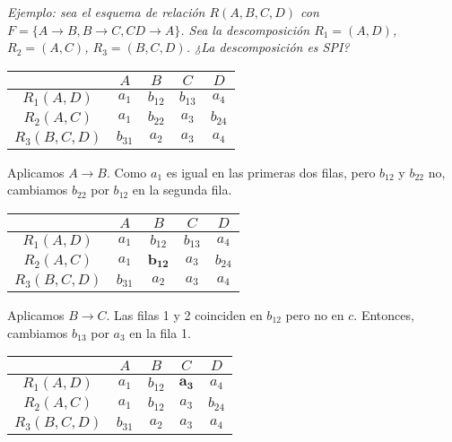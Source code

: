 \documentclass[a4paper, twoside]{article}
\begin{document}
\emph{Ejemplo: sea el esquema de relación $R(A,B,C,D)$ con $F=\{A\to B,B\to C,CD\to A\}$.
Sea la descomposición $R_{1}=(A,D)$, $R_{2}=(A,C)$, $R_{3}=(B,C,D)$.
¿La descomposición es SPI?}

\noindent \begin{center}
\begin{tabular}{|c|c|c|c|c|}
\hline 
 & $A$ & $B$ & $C$ & $D$\\
\hline 
\hline 
$R_{1}(A,D)$ & \textbf{$a_{1}$} & \textbf{$b_{12}$} & $b_{13}$ & $a_{4}$\\
\hline 
$R_{2}(A,C)$ & $a_{1}$ & $b_{22}$ & $a_{3}$ & $b_{24}$\\
\hline 
$R_{3}(B,C,D)$ & $b_{31}$ & $a_{2}$ & $a_{3}$ & \textbf{$a_{4}$}\\
\hline 
\end{tabular}
\par\end{center}

Aplicamos $A\to B$. Como $a_{1}$ es igual en las primeras dos filas,
pero $b_{12}$ y $b_{22}$ no, cambiamos $b_{22}$ por $b_{12}$ en
la segunda fila.

\noindent \begin{center}
\begin{tabular}{|c|c|c|c|c|}
\hline 
 & $A$ & $B$ & $C$ & $D$\\
\hline 
\hline 
$R_{1}(A,D)$ & $a_{1}$ & $b_{12}$ & $b_{13}$ & $a_{4}$\\
\hline 
$R_{2}(A,C)$ & $a_{1}$ & $\mathbf{b_{12}}$ & $a_{3}$ & $b_{24}$\\
\hline 
$R_{3}(B,C,D)$ & $b_{31}$ & $a_{2}$ & $a_{3}$ & \textbf{$a_{4}$}\\
\hline 
\end{tabular}
\par\end{center}

Aplicamos $B\to C.$ Las filas 1 y 2 coinciden en $b_{12}$ pero no
en $c$. Entonces, cambiamos $b_{13}$ por $a_{3}$ en la fila 1.

\noindent \begin{center}
\begin{tabular}{|c|c|c|c|c|}
\hline 
 & $A$ & $B$ & $C$ & $D$\\
\hline 
\hline 
$R_{1}(A,D)$ & $a_{1}$ & $b_{12}$ & $\mathbf{a_{3}}$ & $a_{4}$\\
\hline 
$R_{2}(A,C)$ & $a_{1}$ & $b_{12}$ & $a_{3}$ & $b_{24}$\\
\hline 
$R_{3}(B,C,D)$ & $b_{31}$ & $a_{2}$ & $a_{3}$ & \textbf{$a_{4}$}\\
\hline 
\end{tabular}
\par\end{center}
\end{document}
